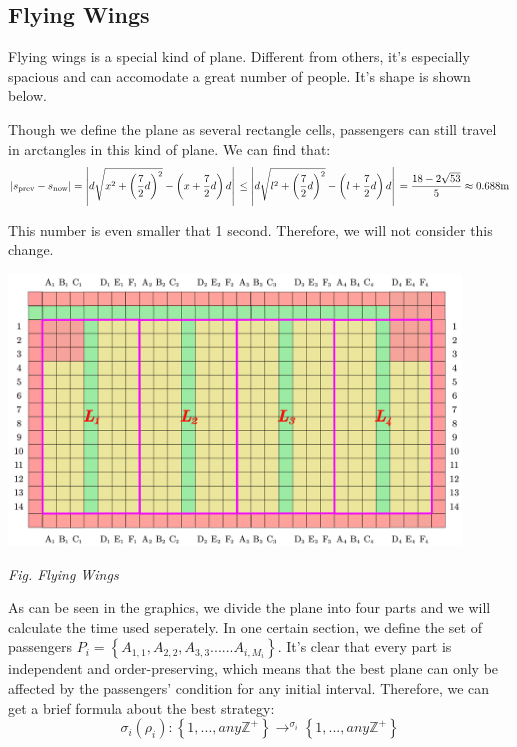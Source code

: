 \documentclass{article}
\theoremstyle{definition}
\theoremstyle{remark}
\numberwithin{equation}{section}
\begin{document}
	\subsection{Flying Wings}
	Flying  wings is a special kind of plane. Different from others, it's especially spacious and can accomodate a great number of people. It's shape is shown below. 

	Though we define the plane as several rectangle cells, passengers can still travel in arctangles in this kind of plane. We can find that:
	$$\left| s_{\mathrm{prev}}-s_{\mathrm{now}} \right|=\left| d\sqrt{x^2+\left( \frac{7}{2}d \right) ^2}-\left( x+\frac{7}{2}d \right) d \right|\\\le \left| d\sqrt{l^2+\left( \frac{7}{2}d \right) ^2}-\left( l+\frac{7}{2}d \right) d \right|\\=\frac{18-2\sqrt{53}}{5}\approx 0.688\mathrm{m}\\$$

	This number is even smaller that 1 second. Therefore, we  will not consider this change.

	\begin{center}
		\includegraphics[width=12cm]{flyingwings.jpg}

		\small \textit{Fig. Flying Wings}
	\end{center}

	As can be seen in the graphics, we divide the plane into four parts and we will calculate the time used seperately. In one certain section, we define the set of passengers $P_i=\left\{A_{1,1},A_{2,2},A_{3,3}......A_{i,M_i}\right\}$. It's clear that every part is independent and order-preserving, which means that the best plane can only be affected by the passengers' condition for any initial interval. Therefore, we can get a brief formula about the best strategy:
	\[\sigma_i (\rho_i): \left\{1,..., any \mathbb{Z}^+\right\}\rightarrow^{\sigma_i} \left\{1,..., any \mathbb{Z}^+ \right\}\]
\end{document}

